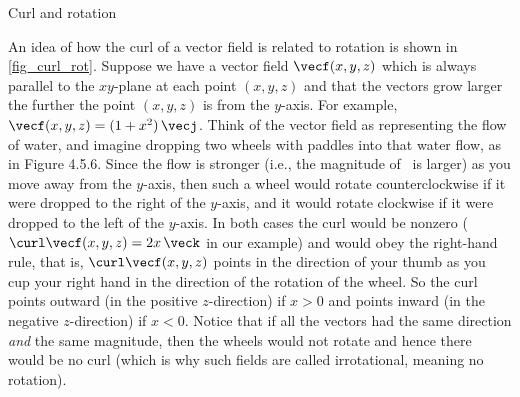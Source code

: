 \begin{lxfigure}
\begin{center}
\caption{Curl and rotation}\label{fig_curl_rot}
\end{center}
\end{lxfigure}

An idea of how the curl of a vector field is related to rotation is shown in \autoref{fig_curl_rot}. Suppose we have a vector field $\vecf(x,y,z)$ which is always parallel to the $xy$-plane at each point $(x,y,z)$ and that the vectors grow larger the further the point $(x,y,z)$ is from the $y$-axis. For example, $\vecf(x,y,z) = (1+x^2 )\,\vecj$. Think of the vector field as representing the flow of water, and imagine dropping two wheels with paddles into that water flow, as in Figure 4.5.6. Since the flow is stronger (i.e., the magnitude of \vecf\ is larger) as you move away from the $y$-axis, then such a wheel would rotate counterclockwise if it were dropped to the right of the $y$-axis, and it would rotate clockwise if it were dropped to the left of the $y$-axis. In both cases the curl would be nonzero ($\curl\vecf(x,y,z) = 2x\,\veck$ in our example) and would obey the right-hand rule, that is, $\curl\vecf(x,y,z)$ points in the direction of your thumb as you cup your right hand in the direction of the rotation of the wheel. So the curl points outward (in the positive $z$-direction) if $x > 0$ and points inward (in the negative $z$-direction) if $x < 0$. Notice that if all the vectors had the same direction \emph{and} the same magnitude, then the wheels would not rotate and hence there would be no curl (which is why such fields are called irrotational, meaning no rotation).

